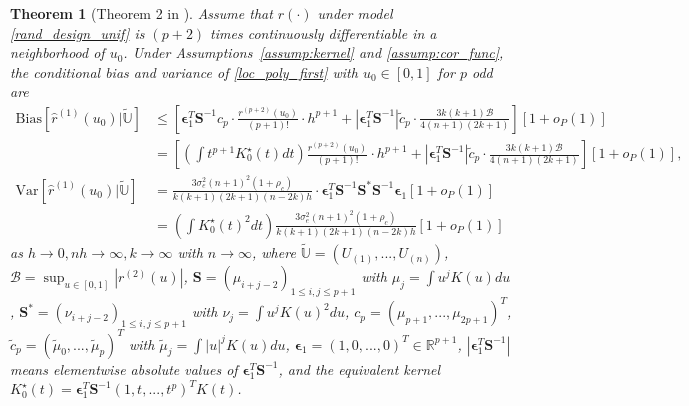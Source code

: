 \documentclass{uwstat572}
\newtheorem{theorem}{Theorem}
\theoremstyle{definition}
\renewcommand{\hat}{\widehat}
\renewcommand{\tilde}{\widetilde}
\theoremstyle{theorem}
\begin{document}
\begin{theorem}[Theorem 2 in \citealt{liu2020smoothed}]
\label{thm:loc_poly_first}
Assume that $r(\cdot)$ under model \eqref{rand_design_unif} is $(p+2)$ times continuously differentiable in a neighborhood of $u_0$. Under Assumptions~\ref{assump:kernel} and \ref{assump:cor_func}, the conditional bias and variance of \eqref{loc_poly_first} with $u_0\in [0,1]$ for $p$ odd are
\begin{align*}
	\mathrm{Bias}\left[\hat{r}^{(1)}(u_0) | \tilde{\mathbb{U}}\right] &\leq\left[\bm{\epsilon}_1^T \bm{S}^{-1}c_p\cdot \frac{r^{(p+2)}(u_0)}{(p+1)!} \cdot h^{p+1} + \left|\bm{\epsilon}_1^T \bm{S}^{-1} \right|\tilde{c}_p \cdot \frac{3k(k+1) \mathcal{B}}{4(n+1)(2k+1)}\right] \left[1+o_P(1)\right]\\
	&= \left[\left(\int t^{p+1} K_0^{\star}(t) dt\right) \frac{r^{(p+2)}(u_0)}{(p+1)!} \cdot h^{p+1} + \left|\bm{\epsilon}_1^T \bm{S}^{-1}\right| \tilde{c}_p \cdot\frac{3k(k+1) \mathcal{B}}{4(n+1)(2k+1)}\right] \left[1+o_P(1)\right],\\
	\mathrm{Var}\left[\hat{r}^{(1)}(u_0) | \tilde{\mathbb{U}}\right] &= \frac{3\sigma_e^2 (n+1)^2 (1+\rho_c)}{k(k+1)(2k+1) (n-2k) h} \cdot \bm{\epsilon}_1^T \bm{S}^{-1} \bm{S}^* \bm{S}^{-1} \bm{\epsilon}_1 \left[1+o_P(1)\right]\\
	&= \left(\int K_0^{\star}(t)^2 dt \right) \frac{3\sigma_e^2 (n+1)^2 (1+\rho_c)}{k(k+1)(2k+1) (n-2k) h} \left[1+o_P(1)\right]
\end{align*}
as $h\to 0, nh\to \infty, k\to \infty$ with $n\to \infty$, where $\tilde{\mathbb{U}}=\left(U_{(1)},...,U_{(n)}\right)$, $\mathcal{B}=\sup_{u\in [0,1]}\left|r^{(2)}(u) \right|$, $\bm{S}=\left(\mu_{i+j-2}\right)_{1\leq i,j\leq p+1}$ with $\mu_j=\int u^j K(u) du$, $\bm{S}^*=\left(\nu_{i+j-2}\right)_{1\leq i,j\leq p+1}$ with $\nu_j = \int u^j K(u)^2 du$, $c_p=\left(\mu_{p+1},...,\mu_{2p+1} \right)^T$, $\tilde{c}_p=\left(\tilde{\mu}_0,...,\tilde{\mu}_{p} \right)^T$ with $\tilde{\mu}_j=\int |u|^j K(u) du$, $\bm{\epsilon}_1=(1,0,...,0)^T \in \mathbb{R}^{p+1}$, $\left|\bm{\epsilon}_1^T\bm{S}^{-1}\right|$ means elementwise absolute values of $\bm{\epsilon}_1^T\bm{S}^{-1}$, and the equivalent kernel $K_0^{\star}(t) = \bm{\epsilon}_1^T \bm{S}^{-1} \left(1,t,...,t^p\right)^T K(t)$.
\end{theorem}
\end{document}
